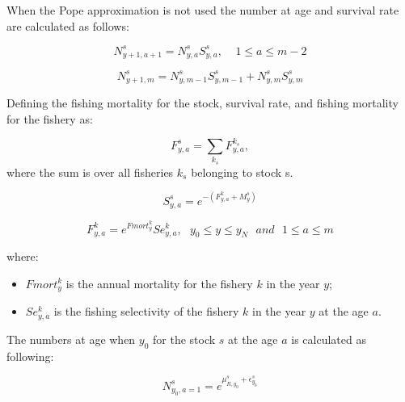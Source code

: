 \documentclass{article}
\begin{document}
When the Pope approximation is not used the number at age and survival rate are calculated as follows:

\begin{equation}
N^s_{y+1,a+1}=N^s_{y,a}S^s_{y,a}, \ \ \ \ \ 1\leq a \leq m-2
\end{equation}

\begin{equation}
N^s_{y+1,m}=N^s_{y,m-1}S^s_{y,m-1}+N^s_{y,m}S^s_{y,m}
\end{equation}

Defining the fishing mortality for the stock, survival rate, and fishing mortality for the fishery as:

\begin{equation}
F^s_{y,a} = \sum_{k_s}F^{k_s}_{y,a}, 
\end{equation}
where the sum is over all fisheries $k_s$ belonging to stock s.

\begin{equation}
S^s_{y,a}=e^{-(F^k_{y,a}+M^{s}_{y})}
\end{equation}

\begin{equation}
F^k_{y,a}=e^{Fmort^k_y}Se^k_{y,a}, \ \ \ y_0\leq y \leq y_N \ \ \ and  \ \ \  1\leq a \leq m
\end{equation}

where:
\begin{itemize}

    
    \item $Fmort^k_y$ is the annual mortality for the fishery $k$ in the year $y$;
    \item $Se^k_{y,a}$ is the fishing selectivity of the fishery $k$ in the year $y$ at the age $a$.

\end{itemize}

\hfill

The numbers at age when $y_0$ for the stock $s$ at the age $a$ is calculated as following:

\begin{equation}
N^s_{y_0,a=1}=e^{\mu^s_{R,y_0} + \epsilon^s_{y_0}}
\end{equation}
\end{document}
